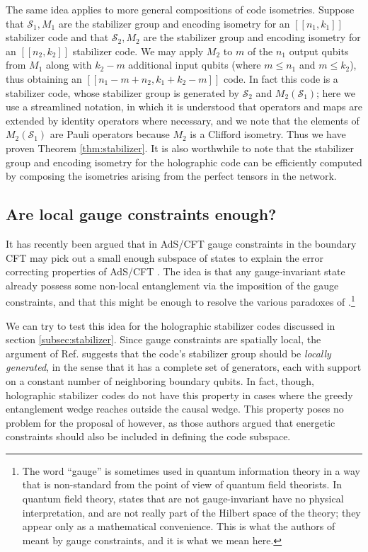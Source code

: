 \documentclass[12pt]{article}
\theoremstyle{plain}
\theoremstyle{plain}
\theoremstyle{plain}
\theoremstyle{plain}
\theoremstyle{result}
\theoremstyle{remark}
\theoremstyle{conjecture}
\theoremstyle{observation}
\theoremstyle{definition}
\theoremstyle{corollary}
\theoremstyle{definition}
\theoremstyle{definition}
\theoremstyle{assumption}
\theoremstyle{definition}
\theoremstyle{problem}
\theoremstyle{fact}
\begin{document}
The same idea applies to more general compositions of code isometries. 
Suppose that $\mathcal{S}_1, M_1$ are the stabilizer group and encoding isometry for an $[[n_1,k_1]]$ stabilizer code and that $\mathcal{S}_2, M_2$ are the stabilizer group and encoding isometry for an $[[n_2,k_2]]$ stabilizer code. 
We may apply $M_2$ to $m$ of the $n_1$ output qubits from $M_1$ along with $k_2-m$ additional input qubits (where $m\le n_1$ and $m \le k_2$), thus obtaining an $[[ n_1- m + n_2, k_1 + k_2-m]]$ code. 
In fact this code is a stabilizer code, whose stabilizer group is generated by $\mathcal{S}_2$ and $M_2(\mathcal{S}_1)$; here we use a streamlined notation, in which it is understood that operators and maps are extended by identity operators where necessary, and we note that the elements of $M_2(\mathcal{S}_1)$ are Pauli operators because $M_2$ is a Clifford isometry. 
Thus we have proven Theorem \ref{thm:stabilizer}. It is also worthwhile to note that the stabilizer group and encoding isometry for the holographic code can be efficiently computed by composing the isometries arising from the perfect tensors in the network. 

\subsection{Are local gauge constraints enough?}\label{subsec:enough}

It has recently been argued that in AdS/CFT gauge constraints in the boundary CFT may pick out a small enough subspace of states to explain the error correcting properties of AdS/CFT \cite{Mintun2015}.  
The idea is that any gauge-invariant state already possess some non-local entanglement via the imposition of the gauge constraints, and that this might be enough to resolve the various paradoxes of \cite{Almheiri14}.\footnote{The word ``gauge'' is sometimes used in quantum information theory in a way that is non-standard from the point of view of quantum field theorists.  In quantum field theory, states that are not gauge-invariant have no physical interpretation, and are not really part of the Hilbert space of the theory; they appear only as a mathematical convenience.   
This is what the authors of \cite{Mintun2015} meant by gauge constraints, and it is what we mean here.}  

We can try to test this idea for the holographic stabilizer codes discussed in section \ref{subsec:stabilizer}. 
Since gauge constraints are spatially local, the argument of Ref. \cite{Mintun2015} suggests that the code's stabilizer group should be \textit{locally generated}, in the sense that it has a complete set of generators, each with support on a constant number of neighboring boundary qubits. In fact, though, holographic stabilizer codes do not have this property in cases where the greedy entanglement wedge reaches outside the causal wedge. 
This property poses no problem for the proposal of  \cite{Almheiri14} however, as those authors argued that energetic constraints should also be included in defining the code subspace.
\end{document}
